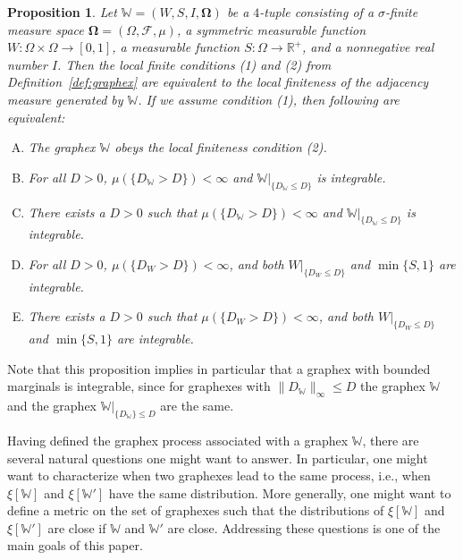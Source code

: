 \documentclass{amsart}
\numberwithin{equation}{section}
\numberwithin{figure}{section}
\newtheorem{proposition}[theorem]{Proposition}
\theoremstyle{definition}
\theoremstyle{remark}
\newcommand{\bOmega}{{\mathbf{\Omega}}}
\newcommand{\RR}{\mathbb{R}}
\newcommand{\cW}{\mathbb{W}}
\newcommand{\cF}{\mathcal{F}}
\begin{document}
\begin{proposition}
\label{prop:local-finite} Let $\cW=(W,S,I,\bOmega)$ be a $4$-tuple consisting
of a $\sigma$-finite measure space $\bOmega=(\Omega,\cF,\mu)$, a symmetric
measurable function $W\colon \Omega \times \Omega \rightarrow [0,1]$, a
measurable function $S\colon \Omega \rightarrow \RR^+$, and a nonnegative
real number $I$. Then the local finite conditions (1) and (2) from
Definition~\ref{def:graphex} are equivalent to the local finiteness of the
adjacency measure generated by $\cW$. If we assume condition (1), then
following are equivalent:
\begin{enumerate}[(A)]
\item The graphex $\cW$ obeys the local finiteness condition (2).
\item For all $D>0$, $\mu(\{D_\cW > D\}) <\infty$ and $\cW|_{\{D_\cW \le
    D\}}$ is integrable.
\item There exists a $D>0$ such that $\mu(\{D_\cW > D\}) <\infty$ and
    $\cW|_{\{D_\cW \le D\}}$ is integrable.
\item For all $D>0$, $\mu(\{D_W > D\}) <\infty$, and both $W|_{\{D_W \le
    D\}}$ and $\min\{S,1\}$ are integrable.
\item There exists a $D>0$ such that $\mu(\{D_W > D\}) <\infty$, and both
    $W|_{\{D_W\le D\}}$ and $\min\{S,1\}$ are integrable.
\end{enumerate}
\end{proposition}

Note that this proposition implies in particular that a graphex with bounded
marginals is integrable, since for graphexes with $\|D_\cW\|_\infty\leq D$
the graphex $\cW$ and the graphex $\cW|_{\{D_\cW\} \le D}$ are the same.

Having defined the graphex process associated with a graphex $\cW$, there are
several natural questions one might want to answer. In particular, one might
want to characterize when two graphexes lead to the same process, i.e., when
$\xi[\cW]$ and $\xi[\cW']$ have the same distribution. More generally, one
might want to define a metric on the set of graphexes such that the
distributions of $\xi[\cW]$ and $\xi[\cW']$ are close if $\cW$ and $\cW'$ are
close. Addressing these questions is one of the main goals of this paper.
\end{document}
